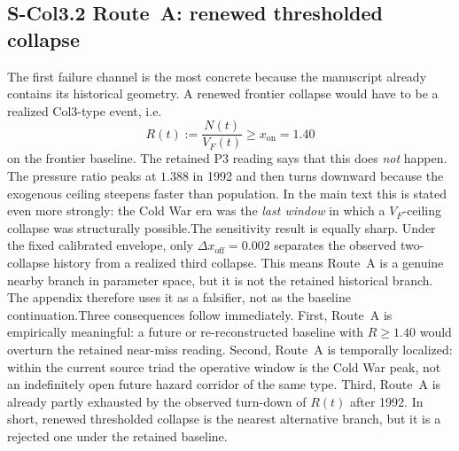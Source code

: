 \documentclass[11pt]{article}
\begin{document}
\subsection*{S-Col3.2 Route~A: renewed thresholded collapse}
\label{sec:S-Col3.2}The first failure channel is the most concrete because the manuscript already contains its historical geometry. A renewed frontier collapse would have to be a realized Col3-type event, i.e.
\begin{equation}R(t):=\frac{N(t)}{V_F(t)}\ge x_{\mathrm{on}}=1.40
\label{eq:S-Col3-routeA}
\end{equation}on the frontier baseline. The retained P3 reading says that this does \emph{not} happen. The pressure ratio peaks at $1.388$ in 1992 and then turns downward because the exogenous ceiling steepens faster than population. In the main text this is stated even more strongly: the Cold War era was the \emph{last window} in which a $V_F$-ceiling collapse was structurally possible.The sensitivity result is equally sharp. Under the fixed calibrated envelope, only $\Delta x_{\mathrm{off}}=0.002$ separates the observed two-collapse history from a realized third collapse. This means Route~A is a genuine nearby branch in parameter space, but it is not the retained historical branch. The appendix therefore uses it as a falsifier, not as the baseline continuation.Three consequences follow immediately. First, Route~A is empirically meaningful: a future or re-reconstructed baseline with $R\ge 1.40$ would overturn the retained near-miss reading. Second, Route~A is temporally localized: within the current source triad the operative window is the Cold War peak, not an indefinitely open future hazard corridor of the same type. Third, Route~A is already partly exhausted by the observed turn-down of $R(t)$ after 1992. In short, renewed thresholded collapse is the nearest alternative branch, but it is a rejected one under the retained baseline.
\end{document}
